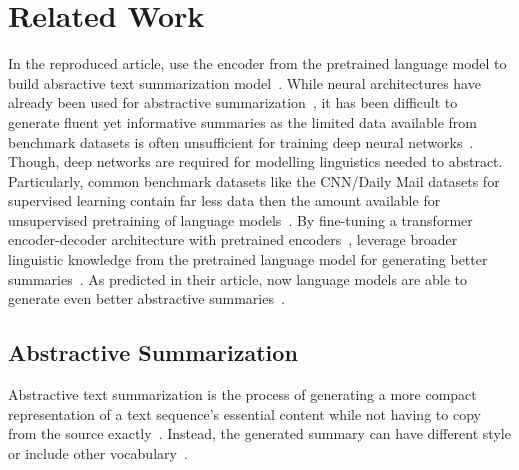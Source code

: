 \section{Related Work} %

In the reproduced article, \citeauthor{LiuL2019} use the encoder from the pretrained \Bert language model to build absractive text summarization model~\cite{LiuL2019,DevlinCLT2019}.
While neural architectures have already been used for abstractive summarization~\cite{NallapatiZSGX2016,SeeLM2017,PaulusXS2018}, it has been difficult to generate fluent yet informative summaries as the limited data available from benchmark datasets is often unsufficient for training deep neural networks~\cite{NallapatiZSGX2016}. Though, deep networks are required for modelling linguistics needed to abstract.
Particularly, common benchmark datasets like the CNN/Daily Mail datasets for supervised learning contain far less data then the amount available for unsupervised pretraining of language models~\cite{HermannKGEKSB2015,DevlinCLT2019}.
By fine-tuning a transformer encoder-decoder architecture with pretrained encoders~\cite{VaswaniSPUJGKP2017,DevlinCLT2019}, \citeauthor{LiuL2019} leverage broader linguistic knowledge from the pretrained language model for generating better summaries~\cite{LiuL2019}.
As predicted in their article, now  language models are able to generate even better abstractive summaries~\todocite\cite{LiuL2019}.

\subsection{Abstractive Summarization}

Abstractive text summarization is the process of generating a more compact representation of a text sequence's essential content while not having to copy from the source exactly~\cite[28]{Torres-Moreno2014}. Instead, the generated summary can have different style or include other vocabulary~\cite{NallapatiZSGX2016}.

